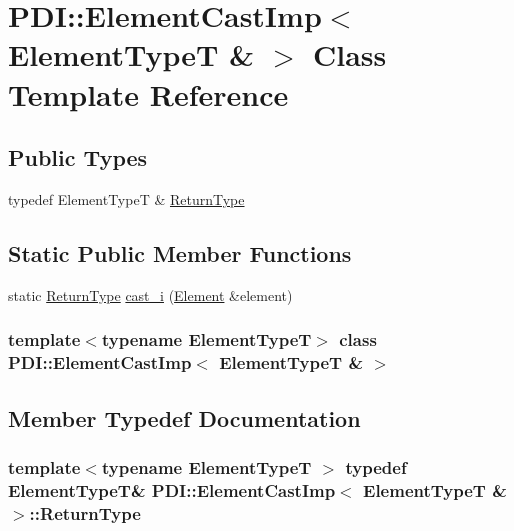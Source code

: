 \hypertarget{class_p_d_i_1_1_element_cast_imp_3_01_element_type_t_01_6_01_4}{
\section{PDI::ElementCastImp$<$ ElementTypeT \& $>$ Class Template Reference}
\label{class_p_d_i_1_1_element_cast_imp_3_01_element_type_t_01_6_01_4}
}
\subsection*{Public Types}
\begin{CompactItemize}
\item 
typedef ElementTypeT \& \hyperlink{class_p_d_i_1_1_element_cast_imp_3_01_element_type_t_01_6_01_4_5376070a65e856f620062f409c9ceab5}{ReturnType}
\end{CompactItemize}
\subsection*{Static Public Member Functions}
\begin{CompactItemize}
\item 
static \hyperlink{class_p_d_i_1_1_element_cast_imp_3_01_element_type_t_01_6_01_4_5376070a65e856f620062f409c9ceab5}{ReturnType} \hyperlink{class_p_d_i_1_1_element_cast_imp_3_01_element_type_t_01_6_01_4_59c1422de92c7a63ebb0f2587c8baa07}{cast\_\-i} (\hyperlink{class_p_d_i_1_1_element}{Element} \&element)
\end{CompactItemize}
\subsubsection*{template$<$typename ElementTypeT$>$ class PDI::ElementCastImp$<$ ElementTypeT \& $>$}



\subsection{Member Typedef Documentation}
\hypertarget{class_p_d_i_1_1_element_cast_imp_3_01_element_type_t_01_6_01_4_5376070a65e856f620062f409c9ceab5}{
\subsubsection[{ReturnType}]{\setlength{\rightskip}{0pt plus 5cm}template$<$typename ElementTypeT $>$ typedef ElementTypeT\& PDI::ElementCastImp$<$ ElementTypeT \& $>$::{\bf ReturnType}}}
\label{class_p_d_i_1_1_element_cast_imp_3_01_element_type_t_01_6_01_4_5376070a65e856f620062f409c9ceab5}




